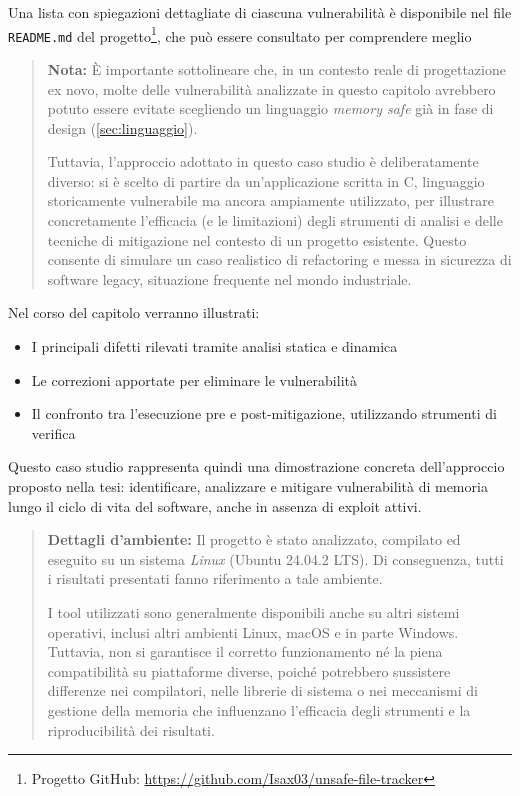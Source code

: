 Una lista con spiegazioni dettagliate di ciascuna vulnerabilità è disponibile nel
file \texttt{README.md} del progetto\footnote{Progetto GitHub: \url{https://github.com/Isax03/unsafe-file-tracker}},
che può essere consultato per comprendere meglio

\begin{quote}
  \textbf{Nota:} È importante sottolineare che, in un contesto reale di progettazione
  ex novo, molte delle vulnerabilità analizzate in questo capitolo avrebbero
  potuto essere evitate scegliendo un linguaggio \textit{memory safe} già in fase
  di design (\autoref{sec:linguaggio}).

  Tuttavia, l'approccio adottato in questo caso studio è deliberatamente diverso:
  si è scelto di partire da un'applicazione scritta in C, linguaggio
  storicamente vulnerabile ma ancora ampiamente utilizzato, per illustrare concretamente
  l'efficacia (e le limitazioni) degli strumenti di analisi e delle tecniche di mitigazione
  nel contesto di un progetto esistente. Questo consente di simulare un caso
  realistico di refactoring e messa in sicurezza di software legacy, situazione frequente
  nel mondo industriale.
\end{quote}

Nel corso del capitolo verranno illustrati:
\begin{itemize}
  \item I principali difetti rilevati tramite analisi statica e dinamica

  \item Le correzioni apportate per eliminare le vulnerabilità

  \item Il confronto tra l'esecuzione pre e post-mitigazione, utilizzando
    strumenti di verifica
\end{itemize}

Questo caso studio rappresenta quindi una dimostrazione concreta dell'approccio
proposto nella tesi: identificare, analizzare e mitigare vulnerabilità di
memoria lungo il ciclo di vita del software, anche in assenza di exploit attivi.

\begin{quote}
  \textbf{Dettagli d'ambiente:} Il progetto è stato analizzato, compilato ed eseguito
  su un sistema \textit{Linux} (Ubuntu 24.04.2 LTS). Di conseguenza, tutti i risultati
  presentati fanno riferimento a tale ambiente.

  I tool utilizzati sono generalmente disponibili anche su altri sistemi operativi,
  inclusi altri ambienti Linux, macOS e in parte Windows. Tuttavia, non si garantisce
  il corretto funzionamento né la piena compatibilità su piattaforme diverse,
  poiché potrebbero sussistere differenze nei compilatori, nelle librerie di sistema
  o nei meccanismi di gestione della memoria che influenzano l'efficacia degli strumenti
  e la riproducibilità dei risultati.
\end{quote}



